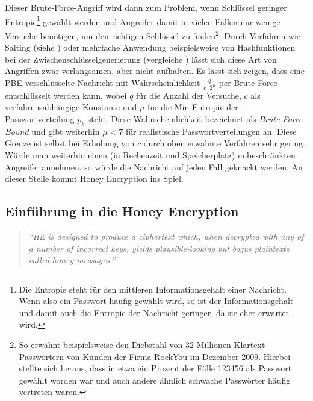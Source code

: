 Dieser Brute-Force-Angriff wird dann zum Problem, wenn Schlüssel geringer Entropie\footnote{Die Entropie steht für den mittleren Informationsgehalt einer Nachricht. Wenn also ein Passwort häufig gewählt wird, so ist der Informationsgehalt und damit auch die Entropie der Nachricht geringer, da sie eher erwartet wird.} gewählt werden und Angreifer damit in vielen Fällen nur wenige Versuche benötigen, um den richtigen Schlüssel zu finden\footnote{So erwähnt \cite{IEEE2014} beispielsweise den Diebstahl von 32 Millionen Klartext-Passwörtern von Kunden der Firma RockYou im Dezember 2009. Hierbei stellte sich heraus, dass in etwa ein Prozent der Fälle 123456 als Passwort gewählt worden war und auch andere ähnlich schwache Passwörter häufig vertreten waren.}. Durch Verfahren wie Salting (siehe \cite{Schneier2006}) oder mehrfache Anwendung beispielsweise von Hashfunktionen bei der Zwischenschlüsselgenerierung (vergleiche \cite{pbkdf2000}) lässt sich diese Art von Angriffen zwar verlangsamen, aber nicht aufhalten. Es lässt sich zeigen, dass eine PBE-verschlüsselte Nachricht mit Wahrscheinlichkeit \(\frac{q}{c \cdot 2^{\mu}}\) per Brute-Force entschlüsselt werden kann, wobei \(q\) für die Anzahl der Versuche, \(c\) als verfahrensabhängige Konstante und \(\mu\) für die Min-Entropie der Passwortverteilung \(p_k\) steht. Diese Wahrscheinlichkeit bezeichnet \cite{EURO2014} als \textit{Brute-Force Bound} und gibt weiterhin \(\mu<7\) für realistische Passwortverteilungen an. Diese Grenze ist selbst bei Erhöhung von \(c\) durch oben erwähnte Verfahren sehr gering. Würde man weiterhin einen (in Rechenzeit und Speicherplatz) unbeschränkten Angreifer annehmen, so würde die Nachricht auf jeden Fall geknackt werden. An dieser Stelle kommt Honey Encryption ins Spiel.

\subsection{Einführung in die Honey Encryption}

\begin{quote}
\textit{"`HE is designed to produce a ciphertext which, when decrypted with any of a number of
incorrect keys, yields plausible-looking but bogus plaintexts called honey messages."'} \cite{EURO2014}
\end{quote}

